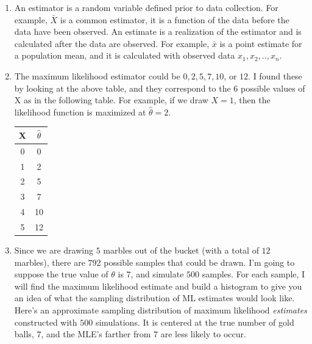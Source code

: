 \documentclass[12pt]{article}\usepackage[]{graphicx}\usepackage[]{color}
\begin{document}
\begin{doublespacing}
\begin{enumerate}
\item An estimator is a random variable defined prior to data collection. For example, $\bar{X}$ is a common estimator, it is a function of the data before the data have been observed. An estimate is a realization of the estimator and is calculated after the data are observed. For example, $\bar{x}$ is a point estimate for a population mean, and it is calculated with observed data $x_1, x_2,.., x_n$.

\item The maximum likelihood estimator could be $0, 2, 5, 7, 10$, or $12$. I found these by looking at the above table, and they correspond to the $6$ possible values of X as in the following table. For example, if we draw $X=1$, then the likelihood function is maximized at $\hat{\theta}=2$.

\begin{table} [H]
\centering
\begin{tabular}{c c}
X & $\hat{\theta}$ \\
\hline
0 & 0 \\
1 & 2 \\
2 & 5 \\
3 & 7 \\
4 & 10 \\
5 & 12 \\
\hline
\end{tabular}
\end{table}

\item Since we are drawing $5$ marbles out of the bucket (with a total of $12$ marbles), there are $792$ possible samples that could be drawn. I'm going to suppose the true value of $\theta$ is $7$, and simulate $500$ samples. For each sample, I will find the maximum likelihood estimate and build a histogram to give you an idea of what the sampling distribution of ML estimates would look like. \\

Here's an approximate sampling distribution of maximum likelihood {\it estimates} constructed with $500$ simulations. It is centered at the true number of gold balls, $7$, and the MLE's farther from $7$ are less likely to occur.


\end{enumerate}
\end{doublespacing}
\end{document}
